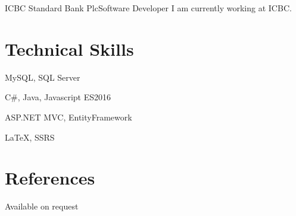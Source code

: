 \documentclass[10pt,a4paper]{moderncv}
\begin{document}
{ICBC Standard Bank Plc}{Software Developer}{}{}
{
	I am currently working at ICBC.
}




\section{Technical Skills}
{MySQL, SQL Server}
{}
{}

{C\#, Java, Javascript ES2016}
{}
{}

{ASP.NET MVC, EntityFramework}
{}
{}

{LaTeX, SSRS}
{}
{}

\section{References}
\qquad \qquad \qquad \quad Available on request
\end{document}
